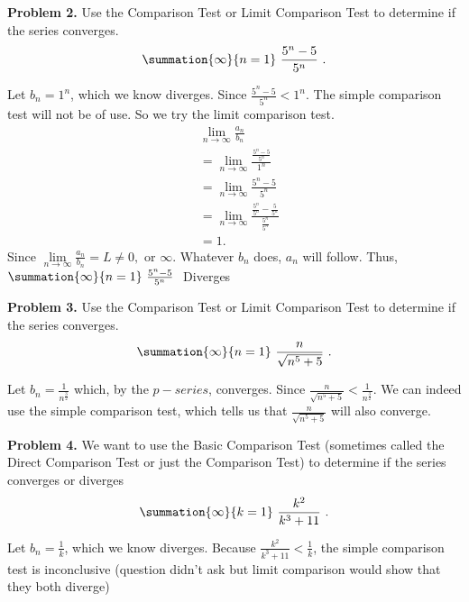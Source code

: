 \documentclass{report}
\begin{document}
    \bigbreak \noindent 
    \begin{mdframed}
        \textbf{Problem 2.} Use the Comparison Test or Limit Comparison Test to determine if the series converges.
        \begin{align*}
            \summation{\infty}{n=1}\ \frac{5^{n}-5}{5^{n}}\ 
        .\end{align*}
    \end{mdframed}
    \bigbreak \noindent 
    Let $b_{n} = 1^{n}$, which we know diverges. Since $\frac{5^{n} - 5}{5^{n}} < 1^{n}$. The simple comparison test will not be of use. So we try the limit comparison test.
    \begin{align*}
        &\lim\limits_{n \to \infty}{\frac{a_{n}}{b_{n}}}  \\
        &=\lim\limits_{n \to \infty}{\frac{\frac{5^{n}-5}{5^{n}}}{1^{n}}} \\
        &= \lim\limits_{n \to \infty}{\frac{5^{n}-5}{5^{n}}} \\
        &=\lim\limits_{n \to \infty}{\frac{\frac{5^{n}}{5^{n}}-\frac{5}{5^{n}}}{\frac{5^{n}}{5^{n}}}} \\
        &=1
    .\end{align*}
    \bigbreak \noindent 
    Since $\lim\limits_{n \to \infty}{\frac{a_{n}}{b_{n}}} = L \ne 0, \text{ or } \infty$. Whatever $b_{n}$ does, $a_{n}$ will follow. Thus, $\summation{\infty}{n=1}\ \frac{5^{n}-5}{5^{n}}\ $ Diverges


    \pagebreak  \bigbreak \noindent 
    \begin{mdframed}
        \textbf{Problem 3.}  Use the Comparison Test or Limit Comparison Test to determine if the series converges.
        \begin{align*}
            \summation{\infty}{n=1}\ \frac{n}{\sqrt{n^{5}+5}}\ 
        .\end{align*}
    \end{mdframed}
    \bigbreak \noindent 
     Let $b_{n}= \frac{1}{n^{\frac{3}{2}}}$ which, by the $p-series$, converges. Since $\frac{n}{\sqrt{n^{5}+5}} < \frac{1}{n^{\frac{3}{2}}}$. We can indeed use the simple comparison test, which tells us that $\frac{n}{\sqrt{n^{5}+5}} $ will also converge.

    \bigbreak \noindent 
    \begin{mdframed}
        \textbf{Problem 4.} We want to use the Basic Comparison Test (sometimes called the Direct Comparison Test or just the Comparison Test) to determine if the series converges or diverges
        \begin{align*}
            \summation{\infty}{k=1}\ \frac{k^{2}}{k^{3} + 11}\ 
        .\end{align*}
    \end{mdframed}
    \bigbreak \noindent 
    Let $b_{n} = \frac{1}{k}$, which we know diverges. Because $\frac{k^{2}}{k^{3}+11} < \frac{1}{k}$, the simple comparison test is inconclusive (question didn't ask but limit comparison would show that they both diverge)
\end{document}
